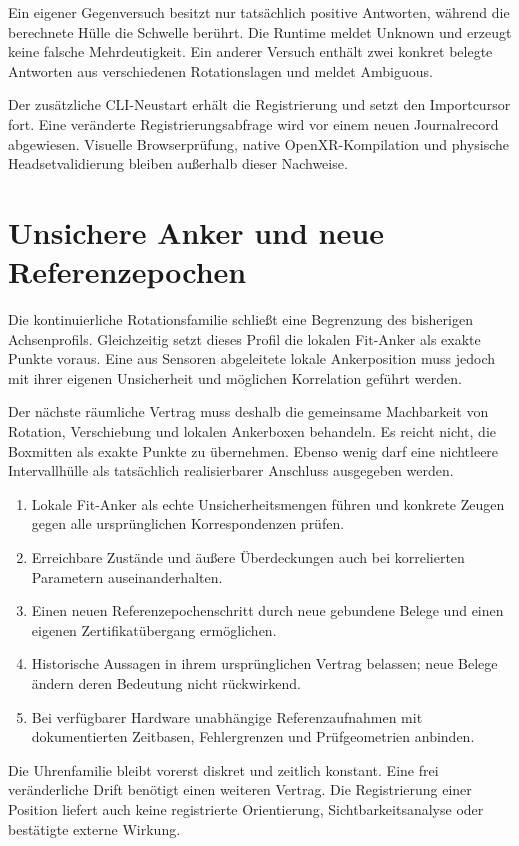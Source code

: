 \documentclass[11pt,a4paper]{article}
\newcommand{\nextsection}[2]{\clearpage{\color{accent}\small\textsf{#1}}\section{#2}}
\begin{document}
Ein eigener Gegenversuch besitzt nur tatsächlich positive
Antworten, während die berechnete Hülle die Schwelle berührt.
Die Runtime meldet Unknown und erzeugt keine falsche Mehrdeutigkeit.
Ein anderer Versuch enthält zwei konkret belegte Antworten aus
verschiedenen Rotationslagen und meldet Ambiguous.

Der zusätzliche CLI-Neustart erhält die Registrierung und setzt
den Importcursor fort. Eine veränderte Registrierungsabfrage
wird vor einem neuen Journalrecord abgewiesen. Visuelle
Browserprüfung, native OpenXR-Kompilation und physische
Headsetvalidierung bleiben außerhalb dieser Nachweise.

\nextsection{105 / NÄCHSTER NACHWEIS}{Unsichere Anker und neue Referenzepochen}
Die kontinuierliche Rotationsfamilie schließt eine Begrenzung des
bisherigen Achsenprofils. Gleichzeitig setzt dieses Profil die
lokalen Fit-Anker als exakte Punkte voraus. Eine aus Sensoren
abgeleitete lokale Ankerposition muss jedoch mit ihrer eigenen
Unsicherheit und möglichen Korrelation geführt werden.

Der nächste räumliche Vertrag muss deshalb die gemeinsame
Machbarkeit von Rotation, Verschiebung und lokalen Ankerboxen
behandeln. Es reicht nicht, die Boxmitten als exakte Punkte
zu übernehmen. Ebenso wenig darf eine nichtleere Intervallhülle
als tatsächlich realisierbarer Anschluss ausgegeben werden.

\begin{enumerate}
\item Lokale Fit-Anker als echte Unsicherheitsmengen führen und
konkrete Zeugen gegen alle ursprünglichen Korrespondenzen prüfen.
\item Erreichbare Zustände und äußere Überdeckungen auch bei
korrelierten Parametern auseinanderhalten.
\item Einen neuen Referenzepochenschritt durch neue gebundene
Belege und einen eigenen Zertifikatübergang ermöglichen.
\item Historische Aussagen in ihrem ursprünglichen Vertrag
belassen; neue Belege ändern deren Bedeutung nicht rückwirkend.
\item Bei verfügbarer Hardware unabhängige Referenzaufnahmen mit
dokumentierten Zeitbasen, Fehlergrenzen und Prüfgeometrien anbinden.
\end{enumerate}

Die Uhrenfamilie bleibt vorerst diskret und zeitlich konstant.
Eine frei veränderliche Drift benötigt einen weiteren Vertrag.
Die Registrierung einer Position liefert auch keine registrierte
Orientierung, Sichtbarkeitsanalyse oder bestätigte externe Wirkung.
\end{document}
